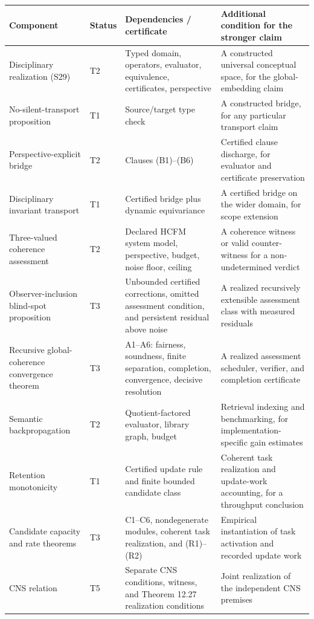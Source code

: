 \documentclass[11pt]{article}
\theoremstyle{definition}
\begin{document}
\begin{center}
\small
\begin{longtable}{@{}p{}p{}p{}p{}@{}}
\toprule
Component & Status & Dependencies / certificate & Additional condition for the stronger claim\\
\midrule
\endhead
Disciplinary realization (S29) & T2 & Typed domain, operators, evaluator, equivalence, certificates, perspective & A constructed universal conceptual space, for the global-embedding claim\\
No-silent-transport proposition & T1 & Source/target type check & A constructed bridge, for any particular transport claim\\
Perspective-explicit bridge & T2 & Clauses (B1)--(B6) & Certified clause discharge, for evaluator and certificate preservation\\
Disciplinary invariant transport & T1 & Certified bridge plus dynamic equivariance & A certified bridge on the wider domain, for scope extension\\
Three-valued coherence assessment & T2 & Declared HCFM system model, perspective, budget, noise floor, ceiling & A coherence witness or valid counter-witness for a non-undetermined verdict\\
Observer-inclusion blind-spot proposition & T3 & Unbounded certified corrections, omitted assessment condition, and persistent residual above noise & A realized recursively extensible assessment class with measured residuals\\
Recursive global-coherence convergence theorem & T3 & A1--A6: fairness, soundness, finite separation, completion, convergence, decisive resolution & A realized assessment scheduler, verifier, and completion certificate\\
Semantic backpropagation & T2 & Quotient-factored evaluator, library graph, budget & Retrieval indexing and benchmarking, for implementation-specific gain estimates\\
Retention monotonicity & T1 & Certified update rule and finite bounded candidate class & Coherent task realization and update-work accounting, for a throughput conclusion\\
Candidate capacity and rate theorems & T3 & C1--C6, nondegenerate modules, coherent task realization, and (R1)--(R2) & Empirical instantiation of task activation and recorded update work\\
CNS relation & T5 & Separate CNS conditions, witness, and Theorem 12.27 realization conditions & Joint realization of the independent CNS premises\\
\bottomrule
\end{longtable}
\end{center}
\end{document}

